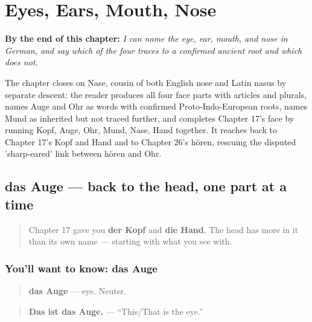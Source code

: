 
\chapter{Eyes, Ears, Mouth, Nose}
\label{ch:ge-face-parts}

\begin{chapteropening}
\textbf{By the end of this chapter:} \emph{I can name the eye, ear, mouth, and nose in German, and say which of the four traces to a confirmed ancient root and which does not.}

The chapter closes on Nase, cousin of both English nose and Latin nasus by separate descent: the reader produces all four face parts with articles and plurals, names Auge and Ohr as words with confirmed Proto-Indo-European roots, names Mund as inherited but not traced further, and completes Chapter 17's face by running Kopf, Auge, Ohr, Mund, Nase, Hand together. It reaches back to Chapter 17's Kopf and Hand and to Chapter 26's hören, rescuing the disputed 'sharp-eared' link between hören and Ohr.
\end{chapteropening}

\section[das Auge]{das Auge — back to the head, one part at a time}

\label{lesson:GE-C30-auge}



\begin{quote}
Chapter 17 gave you \textbf{der Kopf} and \textbf{die Hand}. The head has more in it than its own name — starting with what you see with.
\end{quote}

\subsection*{You'll want to know: das Auge}
\begin{quote}
\textbf{das Auge} — eye. Neuter.
\end{quote}

\begin{quote}
\textbf{Das ist das Auge.} — \textquotedblleft{}This/That is the eye.\textquotedblright{}
\end{quote}

